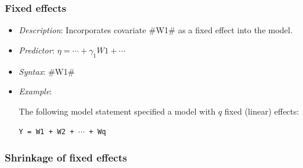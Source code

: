 \subsubsection*{Fixed effects}

\begin{itemize}
\item[] {\em Description}: Incorporates covariate #W1# as a fixed effect into the model.
\item[] {\em Predictor}: $\eta =  \cdots + \gamma_1 W1 + \cdots$
\item[] {\em Syntax}: #W1#
\item[] {\em Example}:

The following model statement specified a model with $q$ fixed
(linear) effects:

\texttt{Y = W1 + W2 + $\cdots$ + Wq}
\end{itemize}

\subsubsection*{Shrinkage of fixed effects}

